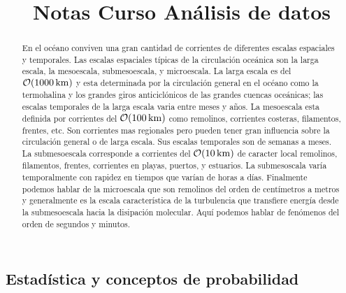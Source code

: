\documentclass[
]{agujournal2019}
\begin{document}
\title{Notas Curso Análisis de datos}




\begin{abstract}
En el océano conviven una gran cantidad de corrientes de diferentes
escalas espaciales y temporales. Las escalas espaciales típicas de la
circulación oceánica son la larga escala, la mesoescala, submesoescala,
y microescala. La larga escala es del \({\cal O}(1000\,{\rm km})\) y
esta determinada por la circulación general en el océano como la
termohalina y los grandes giros anticiclónicos de las grandes cuencas
oceánicas; las escalas temporales de la larga escala varia entre meses y
años. La mesoescala esta definida por corrientes del
\({\cal O}(100\,{\rm km})\) como remolinos, corrientes costeras,
filamentos, frentes, etc. Son corrientes mas regionales pero pueden
tener gran influencia sobre la circulación general o de larga escala.
Sus escalas temporales son de semanas a meses. La submesoescala
corresponde a corrientes del \({\cal O}(10\,{\rm km})\) de caracter
local remolinos, filamentos, frentes, corrientes en playas, puertos, y
estuarios. La submesoscala varía temporalmente con rapidez en tiempos
que varían de horas a días. Finalmente podemos hablar de la microescala
que son remolinos del orden de centímetros a metros y generalmente es la
escala característica de la turbulencia que transfiere energía desde la
submesoescala hacia la disipación molecular. Aquí podemos hablar de
fenómenos del orden de segundos y minutos.
\end{abstract}



\ifdefined\Shaded\renewenvironment{Shaded}{\begin{tcolorbox}[boxrule=0pt, interior hidden, borderline west={3pt}{0pt}{shadecolor}, sharp corners, enhanced, frame hidden, breakable]}{\end{tcolorbox}}\fi



\hypertarget{estaduxedstica-y-conceptos-de-probabilidad}{%
\subsection{Estadística y conceptos de
probabilidad}\label{estaduxedstica-y-conceptos-de-probabilidad}}
\end{document}
